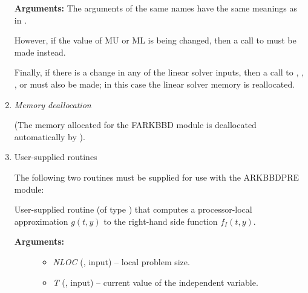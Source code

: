 \documentclass[letterpaper,10pt,english]{sphinxmanual}
\begin{document}
\begin{enumerate}
\begin{fulllineitems}
\textbf{Arguments:}  The arguments of the same names have the same
meanings as in {\hyperref[f_interface/Preconditioning:f/_/FARKBBDINIT]{}}.

\end{fulllineitems}


However, if the value of MU or ML is being changed, then a call to
{\hyperref[f_interface/Preconditioning:f/_/FARKBBDINIT]{}} must be made instead.

Finally, if there is a change in any of the linear solver inputs,
then a call to {\hyperref[f_interface/Usage:f/_/FARKSPGMR]{}}, {\hyperref[f_interface/Usage:f/_/FARKSPBCG]{}},
{\hyperref[f_interface/Usage:f/_/FARKSPTFQMR]{}}, {\hyperref[f_interface/Usage:f/_/FARKSPFGMR]{}} or
{\hyperref[f_interface/Usage:f/_/FARKPCG]{}} must also be made; in this case the linear
solver memory is reallocated.

\item {} 
\emph{Memory deallocation}

(The memory allocated for the FARKBBD module is deallocated
automatically by {\hyperref[f_interface/Usage:f/_/FARKFREE]{}}).

\item {} 
User-supplied routines

The following two routines must be supplied for use with the
ARKBBDPRE module:

\begin{fulllineitems}
\label{f_interface/Preconditioning:f/_/FARKGLOCFN}
User-supplied routine (of type {\hyperref[c_interface/Preconditioners:ARKLocalFn]{}}) that
computes a processor-local approximation $g(t,y)$ to
the right-hand side function $f_I(t,y)$.
\begin{description}
\item[{\textbf{Arguments:}}] \leavevmode\begin{itemize}
\item {} 
\emph{NLOC} (, input) -- local problem size.

\item {} 
\emph{T} (, input) -- current value of the
independent variable.


\end{itemize}
\end{description}
\end{fulllineitems}
\end{enumerate}
\end{document}
